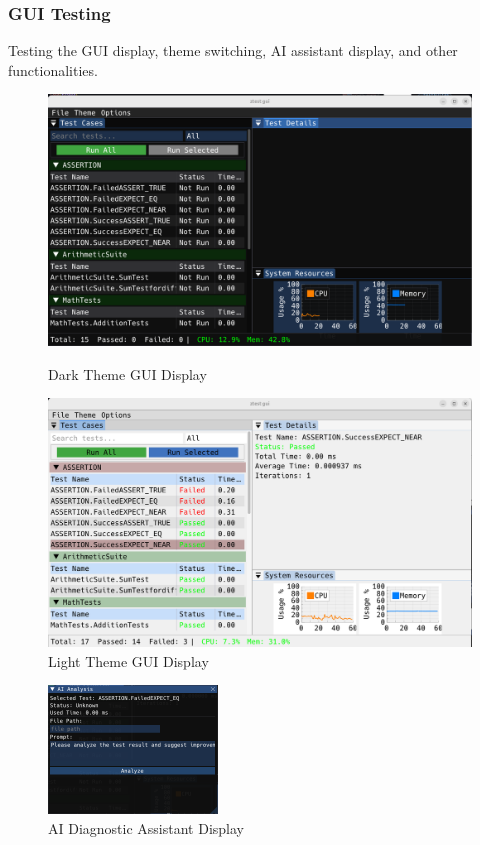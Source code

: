 \documentclass{article}
\begin{document}
\subsubsection{GUI Testing}
Testing the GUI display, theme switching, AI assistant display, and other functionalities.
\begin{figure}[H]
    \centering
    \begin{minipage}{0.5\textwidth}
        \includegraphics[width=\textwidth]{img/showgui.png}
        \caption{Dark Theme GUI Display}
        \label{fig:showgui}
    \end{minipage}%
    \begin{minipage}{0.5\textwidth}
        \includegraphics[width=\textwidth]{img/light.png}
        \caption{Light Theme GUI Display}
        \label{fig:light}
    \end{minipage}
\end{figure}
\begin{figure}[H]
    \centering
    \includegraphics[width=0.4\textwidth]{img/aih.png}
    \caption{AI Diagnostic Assistant Display}
    \label{fig: Data-Driven Function Test}
\end{figure}
\end{document}
